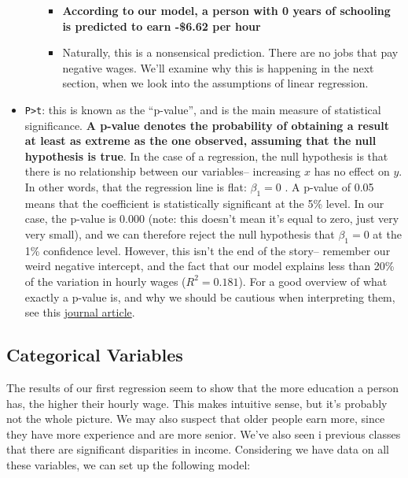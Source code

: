 \documentclass[
  letterpaper,
  DIV=11,
  numbers=noendperiod]{scrreprt}
\providecommand{\tightlist}{%
  \setlength{\itemsep}{0pt}\setlength{\parskip}{0pt}}\usepackage{longtable,booktabs,array}
\begin{document}
\begin{itemize}
\begin{itemize}
    \begin{itemize}
    \tightlist
    \item
      \textbf{According to our model, a person with 0 years of schooling
      is predicted to earn -\$6.62 per hour}
    \item
      Naturally, this is a nonsensical prediction. There are no jobs
      that pay negative wages. We'll examine why this is happening in
      the next section, when we look into the assumptions of linear
      regression.
    \end{itemize}
  \end{itemize}
\item
  \texttt{P\textgreater{}\textbar{}t\textbar{}}: this is known as the
  ``p-value'', and is the main measure of statistical significance.
  \textbf{A p-value denotes the probability of obtaining a result at
  least as extreme as the one observed, assuming that the null
  hypothesis is true}. In the case of a regression, the null hypothesis
  is that there is no relationship between our variables-- increasing
  \(x\) has no effect on \(y\). In other words, that the regression line
  is flat: \(\beta_1=0\) . A p-value of 0.05 means that the coefficient
  is statistically significant at the 5\% level. In our case, the
  p-value is 0.000 (note: this doesn't mean it's equal to zero, just
  very very small), and we can therefore reject the null hypothesis that
  \(\beta_1=0\) at the 1\% confidence level. However, this isn't the end
  of the story-- remember our weird negative intercept, and the fact
  that our model explains less than 20\% of the variation in hourly
  wages (\(R^2=0.181\)). For a good overview of what exactly a p-value
  is, and why we should be cautious when interpreting them, see this
  \href{https://www.ncbi.nlm.nih.gov/pmc/articles/PMC6532382/}{journal
  article}.
\end{itemize}

\hypertarget{categorical-variables}{%
\subsection{Categorical Variables}\label{categorical-variables}}

The results of our first regression seem to show that the more education
a person has, the higher their hourly wage. This makes intuitive sense,
but it's probably not the whole picture. We may also suspect that older
people earn more, since they have more experience and are more senior.
We've also seen i previous classes that there are significant
disparities in income. Considering we have data on all these variables,
we can set up the following model:
\end{document}
